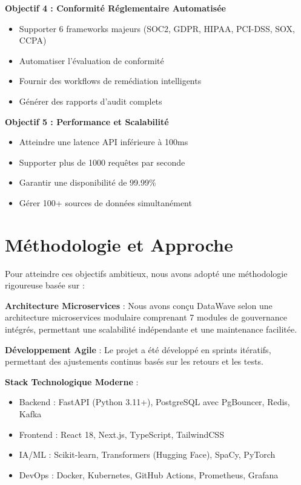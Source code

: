 \textbf{Objectif 4 : Conformité Réglementaire Automatisée}
\begin{itemize}
    \item Supporter 6 frameworks majeurs (SOC2, GDPR, HIPAA, PCI-DSS, SOX, CCPA)
    \item Automatiser l'évaluation de conformité
    \item Fournir des workflows de remédiation intelligents
    \item Générer des rapports d'audit complets
\end{itemize}

\textbf{Objectif 5 : Performance et Scalabilité}
\begin{itemize}
    \item Atteindre une latence API inférieure à 100ms
    \item Supporter plus de 1000 requêtes par seconde
    \item Garantir une disponibilité de 99.99\%
    \item Gérer 100+ sources de données simultanément
\end{itemize}

\section*{Méthodologie et Approche}

Pour atteindre ces objectifs ambitieux, nous avons adopté une méthodologie rigoureuse basée sur :

\textbf{Architecture Microservices} : Nous avons conçu DataWave selon une architecture microservices modulaire comprenant 7 modules de gouvernance intégrés, permettant une scalabilité indépendante et une maintenance facilitée.

\textbf{Développement Agile} : Le projet a été développé en sprints itératifs, permettant des ajustements continus basés sur les retours et les tests.

\textbf{Stack Technologique Moderne} :
\begin{itemize}
    \item Backend : FastAPI (Python 3.11+), PostgreSQL avec PgBouncer, Redis, Kafka
    \item Frontend : React 18, Next.js, TypeScript, TailwindCSS
    \item IA/ML : Scikit-learn, Transformers (Hugging Face), SpaCy, PyTorch
    \item DevOps : Docker, Kubernetes, GitHub Actions, Prometheus, Grafana
\end{itemize}

